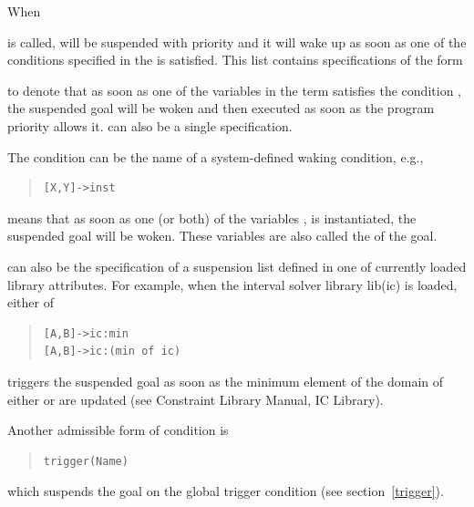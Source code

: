 {When
\begin{quote}
\end{quote}
is called,  will be suspended with priority 
and it will wake up
as soon as one of the conditions specified in the 
is satisfied.
This list contains specifications of the form
\begin{quote}
\end{quote}
to denote that as soon as one of the variables in the term 
satisfies the condition , the suspended goal will
be woken and then executed as soon as the program priority allows it.
 can also be a single specification.

The condition  can be the name of a system-defined waking condition,
e.g.,
\begin{quote}
\begin{verbatim}
[X,Y]->inst
\end{verbatim}
\end{quote}
means that as soon as one (or both) of the variables , 
is instantiated, the suspended goal will be woken.
These variables are also called the  of the
goal.


 can also be the specification of a suspension list
defined in one of currently loaded library attributes. For example, when the
interval solver library lib(ic) is loaded, either of
\begin{quote}
\begin{verbatim}
[A,B]->ic:min
[A,B]->ic:(min of ic)
\end{verbatim}
\end{quote}
triggers the suspended goal as soon as the minimum element
of the domain of either  or  are updated
(see Constraint Library Manual, IC Library).

Another admissible form of condition  is
\begin{quote}
\begin{verbatim}
trigger(Name)
\end{verbatim}
\end{quote}
which suspends the goal on the global trigger condition 
(see section~\ref{trigger}).


}

